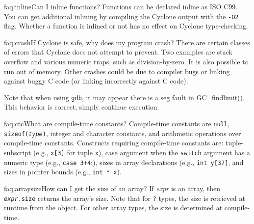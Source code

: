 \begin{faqa}{faq:inline}{Can I inline functions?}
Functions can be declared inline as ISO C99.  You can get additional
inlining by compiling the Cyclone output with the \texttt{-O2} flag.
Whether a function is inlined or not has no effect on Cyclone
type-checking.
\end{faqa}

\begin{faqa}{faq:crash}{If Cyclone is safe, why does my program crash?}
There are certain classes of errors that Cyclone does not attempt to
prevent.  Two examples are stack overflow and various numeric traps,
such as division-by-zero.  It is also possible to run out of memory.
Other crashes could be due to compiler bugs or linking against buggy C
code (or linking incorrectly against C code).

Note that when using \texttt{gdb}, it may appear there is a seg fault
in GC_findlimit().  This behavior is correct; simply continue
execution.
\end{faqa}

\begin{faqa}{faq:ctc}{What are compile-time constants?}
Compile-time constants are \texttt{null},
\texttt{sizeof(\textit{type})}, integer and character constants, and
arithmetic operations over compile-time constants.  Constructs
requiring compile-time constants are: tuple-subscript (e.g.,
\texttt{x[3]} for tuple \texttt{x}), case argument when the
\texttt{switch} argument has a numeric type (e.g., \texttt{case
  3+4}:), sizes in array declarations (e.g., \texttt{int y[37]}, and
sizes in pointer bounds (e.g., \texttt{int * x\rb}).
\end{faqa}

\begin{faqa}{faq:arraysize}{How can I get the size of an array?}
If \textit{expr} is an array, then \texttt{{\it expr}.size} returns
the array's size.  Note that for \texttt{?} types, the size is
retrieved at runtime from the object.  For other array types,
the size is determined at compile-time.
\end{faqa}

